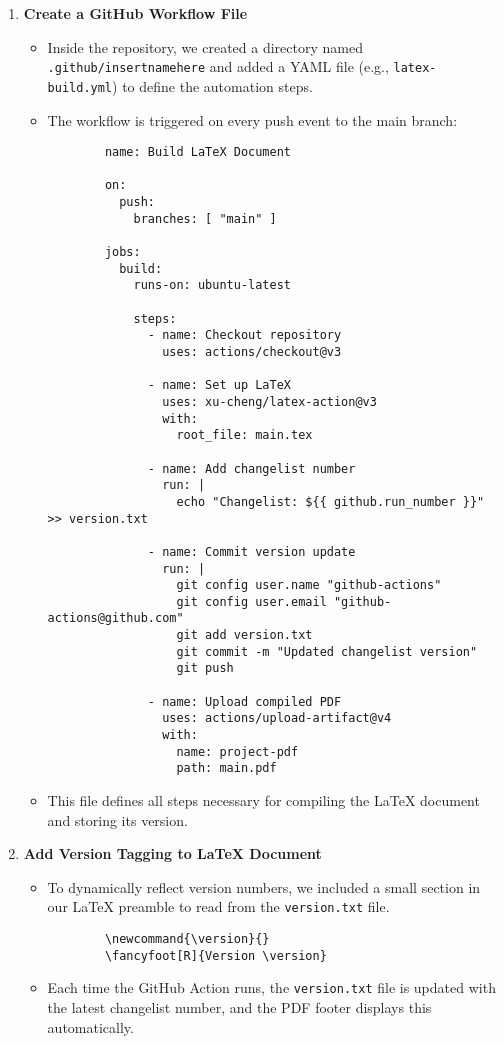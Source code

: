 \begin{enumerate}
    \item \textbf{Create a GitHub Workflow File}
    \begin{itemize}
        \item Inside the repository, we created a directory named \texttt{.github/insertnamehere} and added a YAML file (e.g., \texttt{latex-build.yml}) to define the automation steps.
        \item The workflow is triggered on every push event to the main branch:
        \begin{verbatim}
        name: Build LaTeX Document

        on:
          push:
            branches: [ "main" ]

        jobs:
          build:
            runs-on: ubuntu-latest

            steps:
              - name: Checkout repository
                uses: actions/checkout@v3

              - name: Set up LaTeX
                uses: xu-cheng/latex-action@v3
                with:
                  root_file: main.tex

              - name: Add changelist number
                run: |
                  echo "Changelist: ${{ github.run_number }}" >> version.txt

              - name: Commit version update
                run: |
                  git config user.name "github-actions"
                  git config user.email "github-actions@github.com"
                  git add version.txt
                  git commit -m "Updated changelist version"
                  git push
              
              - name: Upload compiled PDF
                uses: actions/upload-artifact@v4
                with:
                  name: project-pdf
                  path: main.pdf
        \end{verbatim}
        \item This file defines all steps necessary for compiling the LaTeX document and storing its version.
    \end{itemize}

    \item \textbf{Add Version Tagging to LaTeX Document}
    \begin{itemize}
        \item To dynamically reflect version numbers, we included a small section in our LaTeX preamble to read from the \texttt{version.txt} file.
        \begin{verbatim}
        \newcommand{\version}{}
        \fancyfoot[R]{Version \version}
        \end{verbatim}
        \item Each time the GitHub Action runs, the \texttt{version.txt} file is updated with the latest changelist number, and the PDF footer displays this automatically.
    \end{itemize}


\end{enumerate}
